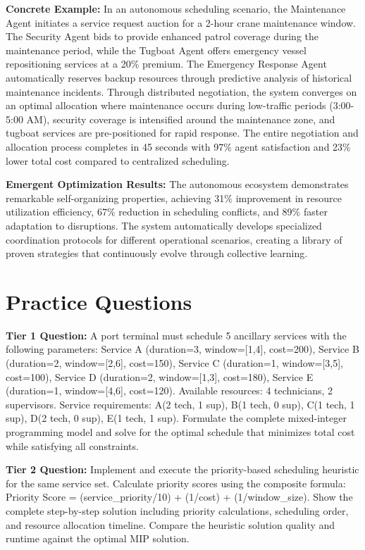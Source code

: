 \documentclass{article}
\begin{document}
\textbf{Concrete Example:} In an autonomous scheduling scenario, the Maintenance Agent initiates a service request auction for a 2-hour crane maintenance window. The Security Agent bids to provide enhanced patrol coverage during the maintenance period, while the Tugboat Agent offers emergency vessel repositioning services at a 20\% premium. The Emergency Response Agent automatically reserves backup resources through predictive analysis of historical maintenance incidents. Through distributed negotiation, the system converges on an optimal allocation where maintenance occurs during low-traffic periods (3:00-5:00 AM), security coverage is intensified around the maintenance zone, and tugboat services are pre-positioned for rapid response. The entire negotiation and allocation process completes in 45 seconds with 97\% agent satisfaction and 23\% lower total cost compared to centralized scheduling.

\textbf{Emergent Optimization Results:} The autonomous ecosystem demonstrates remarkable self-organizing properties, achieving 31\% improvement in resource utilization efficiency, 67\% reduction in scheduling conflicts, and 89\% faster adaptation to disruptions. The system automatically develops specialized coordination protocols for different operational scenarios, creating a library of proven strategies that continuously evolve through collective learning.

\section{Practice Questions}

\textbf{Tier 1 Question:} A port terminal must schedule 5 ancillary services with the following parameters: Service A (duration=3, window=[1,4], cost=200), Service B (duration=2, window=[2,6], cost=150), Service C (duration=1, window=[3,5], cost=100), Service D (duration=2, window=[1,3], cost=180), Service E (duration=1, window=[4,6], cost=120). Available resources: 4 technicians, 2 supervisors. Service requirements: A(2 tech, 1 sup), B(1 tech, 0 sup), C(1 tech, 1 sup), D(2 tech, 0 sup), E(1 tech, 1 sup). Formulate the complete mixed-integer programming model and solve for the optimal schedule that minimizes total cost while satisfying all constraints.

\textbf{Tier 2 Question:} Implement and execute the priority-based scheduling heuristic for the same service set. Calculate priority scores using the composite formula: Priority Score = (service\_priority/10) + (1/cost) + (1/window\_size). Show the complete step-by-step solution including priority calculations, scheduling order, and resource allocation timeline. Compare the heuristic solution quality and runtime against the optimal MIP solution.
\end{document}
